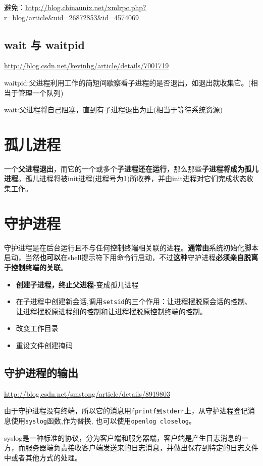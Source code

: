 \documentclass[UTF8,a4paper,8pt]{ctexbook}
\begin{document}
			避免：\url{http://blog.chinaunix.net/xmlrpc.php?r=blog/article&uid=26872853&id=4574069}
			
		\subsection{wait 与 waitpid}
			\url{http://blog.csdn.net/kevinhg/article/details/7001719}
			
			waitpid:父进程利用工作的简短间歇察看子进程的是否退出，如退出就收集它。(相当于管理一个队列)
			
			wait:父进程将自己阻塞，直到有子进程退出为止(相当于等待系统资源)
	\section{孤儿进程}
		一个\textbf{父进程退出}，而它的一个或多个\textbf{子进程还在运行}，那么那些\textbf{子进程将成为孤儿进程}。孤儿进程将被init进程(进程号为1)所收养，并由init进程对它们完成状态收集工作。
				
	\section{守护进程}
		守护进程是在后台运行且不与任何控制终端相关联的进程。\textbf{通常由}系统初始化脚本启动，当然\textbf{也可以}在shell提示符下用命令行启动，不过\textbf{这种}守护进程\textbf{必须亲自脱离于控制终端的关联}。
		
		\begin{itemize}
			\item \textbf{创建子进程，终止父进程}-变成孤儿进程
			\item 在子进程中创建新会话,调用\verb|setsid|的三个作用：让进程摆脱原会话的控制、让进程摆脱原进程组的控制和让进程摆脱原控制终端的控制。
			\item 改变工作目录
			\item 重设文件创建掩码
		\end{itemize}
		
		\subsection{守护进程的输出}
			\url{http://blog.csdn.net/smstong/article/details/8919803}
			
			由于守护进程没有终端，所以它的消息用\verb|fprintf到stderr|上，从守护进程登记消息使用\verb|syslog|函数,作为替换, 也可以使用\verb|openlog closelog|。
						
			syslog是一种标准的协议，分为客户端和服务器端，客户端是产生日志消息的一方，而服务器端负责接收客户端发送来的日志消息，并做出保存到特定的日志文件中或者其他方式的处理。
			
\end{document}

